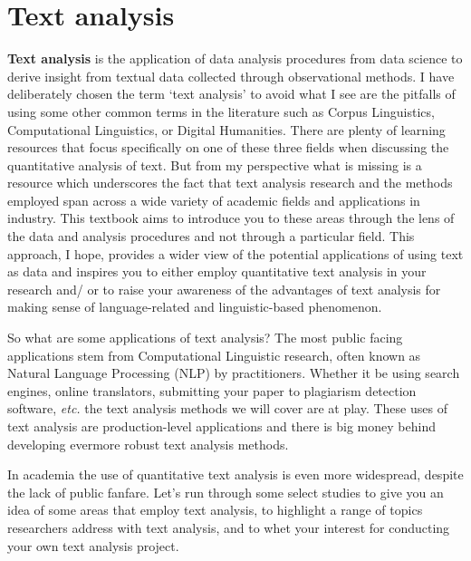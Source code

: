 \documentclass[
  letterpaper,
]{latex/krantz}
\begin{document}
\hypertarget{text-analysis}{%
\section{Text analysis}\label{text-analysis}}

\textbf{Text analysis} is the application of data analysis procedures
from data science to derive insight from textual data collected through
observational methods. I have deliberately chosen the term `text
analysis' to avoid what I see are the pitfalls of using some other
common terms in the literature such as Corpus Linguistics, Computational
Linguistics, or Digital Humanities. There are plenty of learning
resources that focus specifically on one of these three fields when
discussing the quantitative analysis of text. But from my perspective
what is missing is a resource which underscores the fact that text
analysis research and the methods employed span across a wide variety of
academic fields and applications in industry. This textbook aims to
introduce you to these areas through the lens of the data and analysis
procedures and not through a particular field. This approach, I hope,
provides a wider view of the potential applications of using text as
data and inspires you to either employ quantitative text analysis in
your research and/ or to raise your awareness of the advantages of text
analysis for making sense of language-related and linguistic-based
phenomenon.

So what are some applications of text analysis? The most public facing
applications stem from Computational Linguistic research, often known as
Natural Language Processing (NLP) by practitioners. Whether it be using
search engines, online translators, submitting your paper to plagiarism
detection software, \emph{etc.} the text analysis methods we will cover
are at play. These uses of text analysis are production-level
applications and there is big money behind developing evermore robust
text analysis methods.

In academia the use of quantitative text analysis is even more
widespread, despite the lack of public fanfare. Let's run through some
select studies to give you an idea of some areas that employ text
analysis, to highlight a range of topics researchers address with text
analysis, and to whet your interest for conducting your own text
analysis project.
\end{document}
